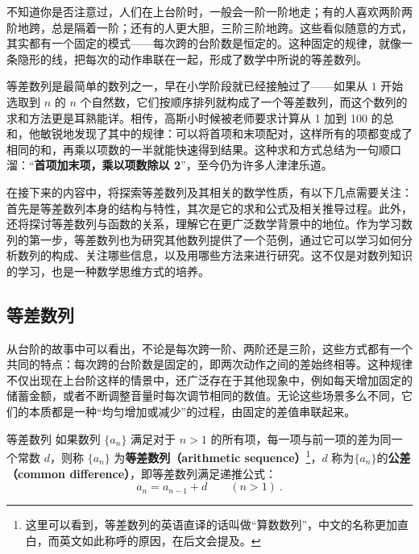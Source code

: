 

不知道你是否注意过，人们在上台阶时，一般会一阶一阶地走；有的人喜欢两阶两阶地跨，总是隔着一阶；还有的人更大胆，三阶三阶地跨。这些看似随意的方式，其实都有一个固定的模式——每次跨的台阶数是恒定的。这种固定的规律，就像一条隐形的线，把每次的动作串联在一起，形成了数学中所说的等差数列。

等差数列是最简单的数列之一，早在小学阶段就已经接触过了——如果从 $1$ 开始选取到  $n$  的  $n$  个自然数，它们按顺序排列就构成了一个等差数列，而这个数列的求和方法更是耳熟能详。相传，高斯小时候被老师要求计算从 1 加到 100 的总和，他敏锐地发现了其中的规律：可以将首项和末项配对，这样所有的项都变成了相同的和，再乘以项数的一半就能快速得到结果。这种求和方式总结为一句顺口溜：“\textbf{首项加末项，乘以项数除以 2}”，至今仍为许多人津津乐道。

在接下来的内容中，将探索等差数列及其相关的数学性质，有以下几点需要关注：首先是等差数列本身的结构与特性，其次是它的求和公式及相关推导过程。此外，还将探讨等差数列与函数的关系，理解它在更广泛数学背景中的地位。作为学习数列的第一步，等差数列也为研究其他数列提供了一个范例，通过它可以学习如何分析数列的构成、关注哪些信息，以及用哪些方法来进行研究。这不仅是对数列知识的学习，也是一种数学思维方式的培养。

\subsection{等差数列}\label{sub_HsAmPg_1}

从台阶的故事中可以看出，不论是每次跨一阶、两阶还是三阶，这些方式都有一个共同的特点：每次跨的台阶数是固定的，即两次动作之间的差始终相等。这种规律不仅出现在上台阶这样的情景中，还广泛存在于其他现象中，例如每天增加固定的储蓄金额，或者不断调整音量时每次调节相同的数值。无论这些场景多么不同，它们的本质都是一种“均匀增加或减少”的过程，由固定的差值串联起来。

\begin{definition}{等差数列}\label{def_HsAmPg_1}
如果数列 $\{a_n\}$ 满足对于 $n > 1$ 的所有项，每一项与前一项的差为同一个常数 $d$，则称 $\{a_n\}$ 为\textbf{等差数列（arithmetic sequence）}\footnote{这里可以看到，等差数列的英语直译的话叫做“算数数列”，中文的名称更加直白，而英文如此称呼的原因，在后文会提及。}，$d$ 称为$\{a_n\}$的\textbf{公差（common difference）}，即等差数列满足递推公式：
\begin{equation}
a_{n}=a_{n-1}+d\qquad(n>1)~.
\end{equation}
\end{definition}

